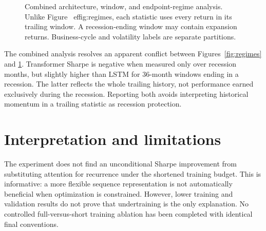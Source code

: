 \documentclass[11pt]{article}
\begin{document}
\begin{figure}[htbp]\centering
{}
\caption{Combined architecture, window, and endpoint-regime analysis. Unlike Figure~
ef{fig:regimes}, each statistic uses every return in its trailing window. A recession-ending window may contain expansion returns. Business-cycle and volatility labels are separate partitions.}\label{fig:combined}
\end{figure}

The combined analysis resolves an apparent conflict between Figures~\ref{fig:regimes} and \ref{fig:combined}. Transformer Sharpe is negative when measured only over recession months, but slightly higher than LSTM for 36-month windows ending in a recession. The latter reflects the whole trailing history, not performance earned exclusively during the recession. Reporting both avoids interpreting historical momentum in a trailing statistic as recession protection.

\clearpage\section{Interpretation and limitations}
The experiment does not find an unconditional Sharpe improvement from substituting attention for recurrence under the shortened training budget. This is informative: a more flexible sequence representation is not automatically beneficial when optimization is constrained. However, lower training and validation results do not prove that undertraining is the only explanation. No controlled full-versus-short training ablation has been completed with identical final conventions.
\end{document}
